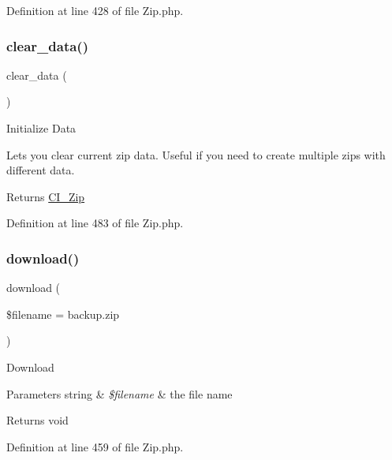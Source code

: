 Definition at line 428 of file Zip.\+php.

\mbox{\label{class_c_i___zip_a89d046bac0ab06a81c5c03d55b4bcae5}} 
\subsubsection{\texorpdfstring{clear\_data()}{clear\_data()}}
{\footnotesize\ttfamily clear\+\_\+data (\begin{DoxyParamCaption}{ }\end{DoxyParamCaption})}

Initialize Data

Lets you clear current zip data. Useful if you need to create multiple zips with different data.

\begin{DoxyReturn}{Returns}
\mbox{\hyperlink{class_c_i___zip}{C\+I\+\_\+\+Zip}} 
\end{DoxyReturn}


Definition at line 483 of file Zip.\+php.

\mbox{\label{class_c_i___zip_ad4263f6c296942842ae25a94053c5f16}} 
\subsubsection{\texorpdfstring{download()}{download()}}
{\footnotesize\ttfamily download (\begin{DoxyParamCaption}\item[{}]{\$filename = {\ttfamily \textquotesingle{}backup.zip\textquotesingle{}} }\end{DoxyParamCaption})}

Download


\begin{DoxyParams}[1]{Parameters}
string & {\em \$filename} & the file name \\
\hline
\end{DoxyParams}
\begin{DoxyReturn}{Returns}
void 
\end{DoxyReturn}


Definition at line 459 of file Zip.\+php.

\mbox{\label{class_c_i___zip_a263fd906f99ccca15a12fe34a79656e4}} 
